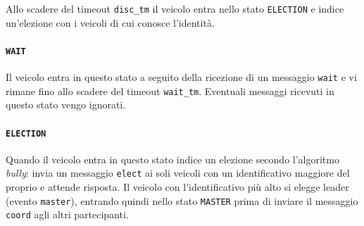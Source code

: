 \documentclass{memoir}
\begin{document}
Allo scadere del timeout \texttt{disc\_tm} il veicolo entra nello stato
\texttt{ELECTION} e indice un'elezione con i veicoli di cui conosce l'identità.

\paragraph{\texttt{WAIT}}
Il veicolo entra in questo stato a seguito della ricezione di un messaggio
\texttt{wait} e vi rimane fino allo scadere del timeout \texttt{wait\_tm}.
Eventuali messaggi ricevuti in questo stato vengo ignorati.

\begin{figure}[h]
  \centering
\end{figure}

\paragraph{\texttt{ELECTION}}
Quando il veicolo entra in questo stato indice un elezione secondo l'algoritmo
\emph{bully}: invia un messaggio \texttt{elect} ai soli veicoli con un
identificativo maggiore del proprio e attende risposta. Il veicolo con
l'identificativo più alto si elegge leader (evento \texttt{master}), entrando
quindi nello stato \texttt{MASTER} prima di inviare il messaggio \texttt{coord}
agli altri partecipanti.

\begin{figure}[h]
  \centering
\end{figure}
\end{document}
